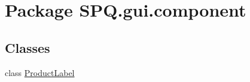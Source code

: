 \hypertarget{namespace_s_p_q_1_1gui_1_1component}{}\section{Package S\+P\+Q.\+gui.\+component}
\label{namespace_s_p_q_1_1gui_1_1component}
\subsection*{Classes}
\begin{DoxyCompactItemize}
\item 
class \mbox{\hyperlink{class_s_p_q_1_1gui_1_1component_1_1_product_label}{Product\+Label}}
\end{DoxyCompactItemize}
